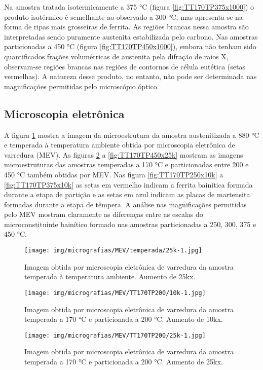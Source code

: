 Na amostra tratada isotermicamente a 375 °C (figura \ref{fig:TT170TP375x1000}) o produto isotérmico é semelhante ao observado a 300 °C, mas apresenta-se na forma de ripas mais grosseiras de ferrita. As regiões brancas nessa amostra são interpretadas sendo puramente austenita estabilizada pelo carbono. Nas amostras particionadas a 450 °C (figura \ref{fig:TT170TP450x1000}), embora não tenham sido quantificados frações volumétricas de austenita pela difração de raios X, observam-se regiões brancas nas regiões de contornos de célula eutética (setas vermelhas). A natureza desse produto, no entanto, não pode ser determinada nas magnificações permitidas pelo microscópio óptico.

\subsection{Microscopia eletrônica}

A figura \ref{fig:temperadax25k} mostra a imagem da microestrutura da amostra austenitizada a 880 °C e temperada à temperatura ambiente obtida por microscopia eletrônica de varredura (MEV). As figuras \ref{fig:TT170TP200x10k} a \ref{fig:TT170TP450x25k} mostram as imagens microestruturas das amostras temperadas a 170 °C e particionadas entre 200 e 450 °C também obtidas por MEV. Nas figura \ref{fig:TT170TP250x10k} a \ref{fig:TT170TP375x10k} as setas em vermelho indicam a ferrita bainítica formada durante a etapa de partição e as setas em azul indicam as placas de martensita formadas durante a etapa de têmpera. A análise nas magnificações permitidas pelo MEV mostram claramente as diferenças entre as escalas do microconstituinte bainítico formado nas amostras particionadas a 250, 300, 375 e 450 °C.

\begin{figure}
	\texttt{[image: img/micrografias/MEV/temperada/25k-1.jpg]}
	\caption{Imagem obtida por microscopia eletrônica de varredura da amostra temperada à temperatura ambiente. Aumento de 25kx.}
	\label{fig:temperadax25k}
\end{figure}

\begin{figure}
	\texttt{[image: img/micrografias/MEV/TT170TP200/10k-1.jpg]}
	\caption{Imagem obtida por microscopia eletrônica de varredura da amostra temperada a 170 °C e particionada a 200 °C. Aumento de 10kx.}
	\label{fig:TT170TP200x10k}
\end{figure}

\begin{figure}
	\texttt{[image: img/micrografias/MEV/TT170TP200/25k-1.jpg]}
	\caption{Imagem obtida por microscopia eletrônica de varredura da amostra temperada a 170 °C e particionada a 200 °C. Aumento de 25kx.}
	\label{fig:TT170TP200x25k}
\end{figure}

